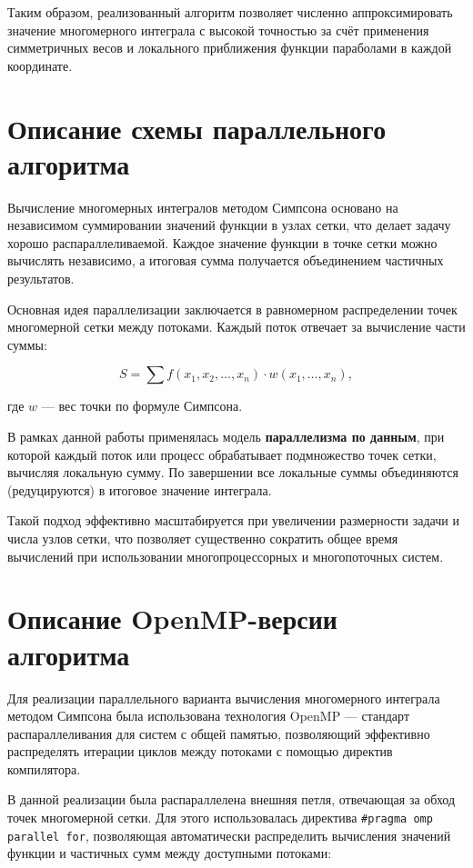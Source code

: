 \documentclass[a4paper,12pt]{article}
\begin{document}
Таким образом, реализованный алгоритм позволяет численно аппроксимировать значение многомерного интеграла с высокой точностью за счёт применения симметричных весов и локального приближения функции параболами в каждой координате.

\section{Описание схемы параллельного алгоритма}

Вычисление многомерных интегралов методом Симпсона основано на независимом суммировании значений функции в узлах сетки, что делает задачу хорошо распараллеливаемой. Каждое значение функции в точке сетки можно вычислять независимо, а итоговая сумма получается объединением частичных результатов.

Основная идея параллелизации заключается в равномерном распределении точек многомерной сетки между потоками. Каждый поток отвечает за вычисление части суммы:

$$
S = \sum f(x_1, x_2, \dots, x_n) \cdot w(x_1, \dots, x_n),
$$

где $w$ — вес точки по формуле Симпсона.

В рамках данной работы применялась модель \textbf{параллелизма по данным}, при которой каждый поток или процесс обрабатывает подмножество точек сетки, вычисляя локальную сумму. По завершении все локальные суммы объединяются (редуцируются) в итоговое значение интеграла.

Такой подход эффективно масштабируется при увеличении размерности задачи и числа узлов сетки, что позволяет существенно сократить общее время вычислений при использовании многопроцессорных и многопоточных систем.


\section{Описание OpenMP-версии алгоритма}

Для реализации параллельного варианта вычисления многомерного интеграла методом Симпсона была использована технология OpenMP — стандарт распараллеливания для систем с общей памятью, позволяющий эффективно распределять итерации циклов между потоками с помощью директив компилятора.

В данной реализации была распараллелена внешняя петля, отвечающая за обход точек многомерной сетки. Для этого использовалась директива \texttt{\#pragma omp parallel for}, позволяющая автоматически распределить вычисления значений функции и частичных сумм между доступными потоками:
\end{document}
